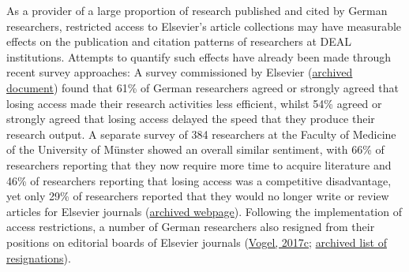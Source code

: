 \documentclass[
]{article}
\begin{document}
As a provider of a large proportion of research published and cited by German researchers, restricted access to Elsevier's article collections may have measurable effects on the publication and citation patterns of researchers at DEAL institutions. Attempts to quantify such effects have already been made through recent survey approaches: A survey commissioned by Elsevier (\href{https://web.archive.org/web/20210427160017/https://resources.mynewsdesk.com/image/upload/fl_attachment/sgmm6zhwdmam4ys7evvf}{archived document}) found that 61\% of German researchers agreed or strongly agreed that losing access made their research activities less efficient, whilst 54\% agreed or strongly agreed that losing access delayed the speed that they produce their research output. A separate survey of 384 researchers at the Faculty of Medicine of the University of Münster showed an overall similar sentiment, with 66\% of researchers reporting that they now require more time to acquire literature and 46\% of researchers reporting that losing access was a competitive disadvantage, yet only 29\% of researchers reported that they would no longer write or review articles for Elsevier journals (\href{https://web.archive.org/web/20210429122105/https://www.uni-muenster.de/ZBMed/aktuelles/27850}{archived webpage}). Following the implementation of access restrictions, a number of German researchers also resigned from their positions on editorial boards of Elsevier journals (\href{https://doi.org/10.1126/science.aar2142}{Vogel, 2017c}; \href{https://web.archive.org/web/20210427081142/https://www.projekt-deal.de/aktuelles-zu-elsevier/}{archived list of resignations}).
\end{document}
